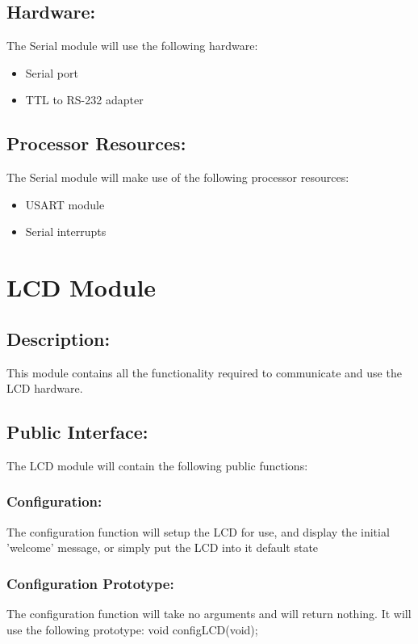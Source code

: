 \documentclass[]{article}
\begin{document}
\subsection{Hardware:}
The Serial module will use the following hardware:
\begin{itemize}
	\item Serial port
	\item TTL to RS-232 adapter
\end{itemize}

\subsection{Processor Resources:}
The Serial module will make use of the following processor resources:
\begin{itemize}
	\item USART module
	\item Serial interrupts
\end{itemize}

\newpage
\section{LCD Module}
 
\subsection{Description:}
This module contains all the functionality required to communicate and use the LCD hardware.

\subsection{Public Interface:}
The LCD module will contain the following public functions:

\subsubsection{Configuration:}
The configuration function will setup the LCD for use, and display the initial 'welcome' message, or simply put the LCD into it default state

\subsubsection{Configuration Prototype:}
The configuration function will take no arguments and will return nothing. It will use the following prototype: \newline \newline
void configLCD(void);
\end{document}
